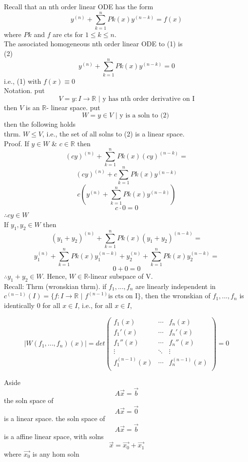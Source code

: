 \documentclass[10pt,a4paper]{article}
\theoremstyle{definition}
\begin{document}
  \newpage
  Recall that an nth order linear ODE has the form 
  \[ 
  \tag{1} 
  \label{nth order linear ODE}
  y^{(n)} + \sum_{k=1}^n Pk(x)y^{(n-k)} = f(x)
  \]
  where \( Pk \) and \( f \) are cts for \( 1 \leq k \leq n \). \\
  The associated homogeneous nth order linear ODE to (1) is\\
  (2)
  \[ y^{(n)} + \sum_{k=1}^n Pk(x)y^{(n-k)} = 0 \]
  i.e., (1) with \( f(x) \equiv 0 \)\\
  Notation. put 
  \[ V = { y: I \to \mathbb{R} \text{ |  y has nth order derivative on I}  } \]
  then \( V \) is an \( \mathbb{R} \)- linear space. put 
  \[ W =  { y \in V \text{ | y is a soln to (2) }  } \]
  then the following holds\\[5mm]
  thrm. \( W \leq V \), i.e., the set of all solns to (2) is a linear
  space. \\
  Proof. If \( y \in W \) \& \( c \in \mathbb{R} \) then 
  \[ (cy)^{(n)} + \sum_{k=1}^n Pk(x)(cy)^{(n-k)}  = \]
  \[ (cy)^{(n)} + c\sum_{k=1}^n Pk(x)y^{(n-k)} \]
  \[ c(y^{(n)} + \sum_{k=1}^n Pk(x)y^{(n-k)}) \]
  \[ c \cdot 0 = 0 \]
  \( \therefore cy\in W \) \\
  If \( y_1, y_2 \in W \) then 
  \[ (y_1 + y_2)^{(n)} + \sum_{k=1}^n Pk(x)(y_1 +y_2 )^{(n-k)} = \]
  \[ y_1^{(n)} + \sum_{k=1}^n Pk(x)y_1^{(n-k)} + y_2^{(n)} +
  \sum_{k=1}^n Pk(x)y_2^{(n-k)} = \]
  \[ 0 + 0 = 0  \]
  \( \therefore y_1 + y_2 \in W \). Hence, \( W \in \mathbb{R} \)-linear
  subspace of V. \\[5mm]
  Recall: 
  Thrm (wronskian thrm). if \( f_1, ..., f_n \) are linearly independent
  in \( c^{(n-1)} (I) = \{ f:I\to \mathbb{R} \text{ | } f^{(n-1)} \text{
  is cts on I} \} \), then the wronskian of \( f_1, ..., f_n \) is identically 0
  for all \( x \in I \), i.e., for all \( x \in I \), 

  \[ |W(f_1, ...,f_n)(x)|  = det 
  \begin{pmatrix} 
    f_1(x)         & \cdots & f_n(x) \\
    f_1'(x)        & \cdots & f_n'(x) \\
    f_1''(x)       & \cdots & f_n''(x) \\
    \vdots         & \ddots & \vdots\\
    f_1^{(n-1)}(x) & \cdots & f_n^{(n-1)}(x) \\
  \end{pmatrix}
  =0\]


  Aside
  \[ A \vec{x}  = \vec{b} \]
  the soln space of 
  \[ A \vec{x} =\vec{0} \]
  is a linear space. the soln space of 
  \[ A \vec{x}  = \vec{b} \]
  is a affine linear space, with solns 
  \[ \vec{x} = \vec{x_0} + \vec{x_1}\]
  where \( \vec{x_0} \) is any hom soln
\end{document}
